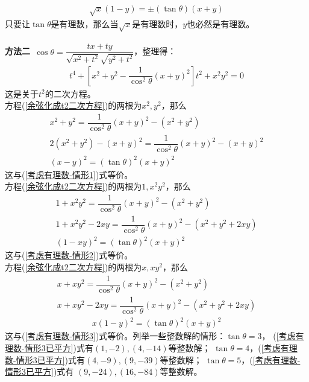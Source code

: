 \begin{enumerate}[label={【\textbf{例\thechapter.\arabic*}】},
 leftmargin=\inteval{\myenumleftmargin}pt,
 itemsep=\inteval{\myenumitempsep}pt,
 itemindent=\inteval{\myenumitemindent}pt]
\begin{gather}\label{考虑有理数-情形3}
    \sqrt{x}(1-y)=\pm(\tan\theta)(x+y) 
\end{gather}
只要让$ \tan\theta $是有理数，那么当$ \sqrt{x} $是有理数时，$ y $也必然是有理数。\\
\\
\textbf{方法二}\ $ \cos\theta=\dfrac{tx+ty}{\sqrt{x^2+t^2}\sqrt{y^2+t^2}} $，整理得：
\begin{align}\label{余弦化成t2二次方程}
    t^4+\left[x^2+y^2-\dfrac{1}{\cos^2\theta}(x+y)^2\right]t^2+x^2y^2=0
\end{align}
这是关于$ t^2 $的二次方程。\\
 方程(\ref{余弦化成t2二次方程})的两根为$ x^2,y^2 $，那么
\begin{gather*}
    x^2+y^2=\dfrac{1}{\cos^2\theta}(x+y)^2-(x^2+y^2) \\
    2(x^2+y^2)-(x+y)^2=\dfrac{1}{\cos^2\theta}(x+y)^2 -(x+y)^2 \\
    (x-y)^2=(\tan\theta)^2(x+y)^2
\end{gather*}
这与(\ref{考虑有理数-情形1})式等价。\\
 方程(\ref{余弦化成t2二次方程})的两根为$ 1,x^2y^2 $，那么
\begin{gather*}
    1+x^2y^2=\dfrac{1}{\cos^2\theta}(x+y)^2-(x^2+y^2) \\
    1+x^2y^2-2xy=\dfrac{1}{\cos^2\theta}(x+y)^2-(x^2+y^2+2xy) \\
    (1-xy)^2=(\tan\theta)^2 (x+y)^2 
\end{gather*}
这与(\ref{考虑有理数-情形2})式等价。\\
 方程(\ref{余弦化成t2二次方程})的两根为$ x,xy^2 $，那么
\begin{gather*}
    x+xy^2=\dfrac{1}{\cos^2\theta}(x+y)^2-(x^2+y^2) \\
    x+xy^2-2xy=\dfrac{1}{\cos^2\theta}(x+y)^2-(x^2+y^2+2xy) 
\end{gather*}
\begin{gather}\label{考虑有理数-情形3已平方}
    x(1-y)^2=(\tan\theta)^2(x+y)^2
\end{gather}
这与(\ref{考虑有理数-情形3})式等价。列举一些整数解的情形：$ \tan\theta=3 $，
(\ref{考虑有理数-情形3已平方})式有$ (1,-2),(4,-14) $等整数解；
$ \tan\theta=4 $，(\ref{考虑有理数-情形3已平方})式有$ (4,-9),(9,-39) $等整数解；
$ \tan\theta=5 $，(\ref{考虑有理数-情形3已平方})式有
$ (9,-24),(16,-84) $等整数解。


\end{enumerate}
